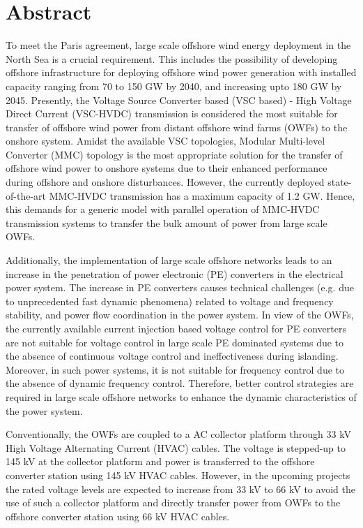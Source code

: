 \chapter*{Abstract}
To meet the Paris agreement, large scale offshore wind energy deployment in the North Sea is a crucial requirement.  
This includes the possibility of developing offshore infrastructure for deploying offshore wind power generation with installed capacity ranging from 70 to 150 GW by 2040, and increasing upto 180 GW by 2045. Presently, the Voltage Source Converter based (VSC based) - High Voltage Direct Current (VSC-HVDC) transmission is considered the most suitable for transfer of offshore wind power from distant offshore wind farms (OWFs) to the onshore system. Amidst the available VSC topologies, Modular Multi-level Converter (MMC) topology is the most appropriate  solution for the transfer of offshore wind power to onshore systems due to their enhanced performance during offshore and onshore disturbances. However, the currently deployed state-of-the-art MMC-HVDC transmission has a maximum capacity of 1.2 GW. Hence, this demands for a generic model with parallel operation of MMC-HVDC transmission systems to transfer the bulk amount of power from large scale OWFs. 

Additionally, the implementation of large scale offshore networks leads to an increase in the penetration of power electronic (PE) converters in the electrical power system. The increase in PE converters causes technical challenges (e.g. due to unprecedented fast dynamic phenomena) related to voltage and frequency stability, and power flow coordination in the power system. In view of the OWFs, the currently available current injection based voltage control for PE converters are not suitable for voltage control in large scale PE dominated systems due to the absence of continuous voltage control and ineffectiveness during islanding. Moreover, in such power systems, it is not suitable for frequency control due to the absence of dynamic frequency control. Therefore, better control strategies are required in large scale offshore networks to enhance the dynamic characteristics of the power system. 

Conventionally, the OWFs are coupled to a AC collector platform through 33 kV High Voltage Alternating Current (HVAC) cables. The voltage is stepped-up to 145 kV at the collector platform and power is transferred to the offshore converter station using 145 kV HVAC cables. However, in the upcoming projects the rated voltage levels are expected to increase from 33 kV to 66 kV to avoid the use of such a collector platform and directly transfer power from OWFs to the offshore converter station using 66 kV HVAC cables.   

